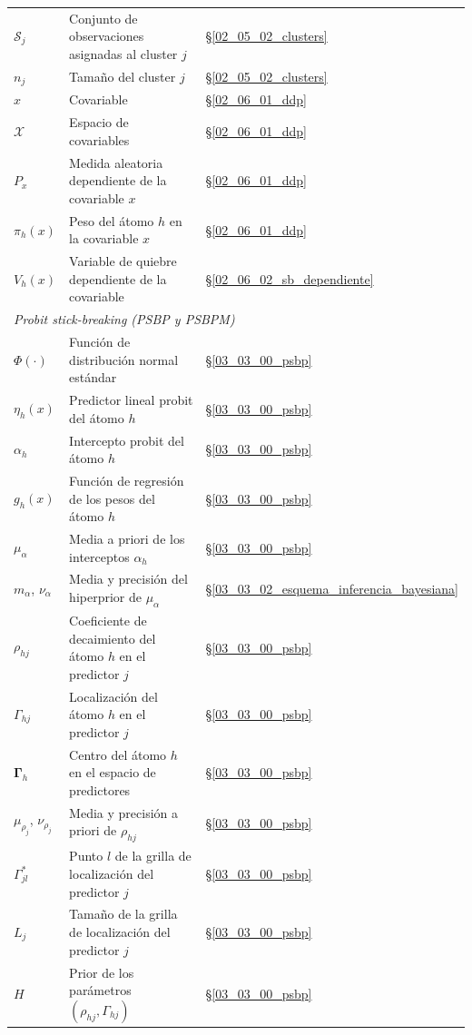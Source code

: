 \begin{longtable}{p{} p{} p{}}
$\mathcal{S}_j$ & Conjunto de observaciones asignadas al cluster $j$ & \S\ref{02_05_02_clusters} \\
$n_j$ & Tamaño del cluster $j$ & \S\ref{02_05_02_clusters} \\
$x$ & Covariable & \S\ref{02_06_01_ddp} \\
$\mathcal{X}$ & Espacio de covariables & \S\ref{02_06_01_ddp} \\
$P_x$ & Medida aleatoria dependiente de la covariable $x$ & \S\ref{02_06_01_ddp} \\
$\pi_h(x)$ & Peso del átomo $h$ en la covariable $x$ & \S\ref{02_06_01_ddp} \\
$V_h(x)$ & Variable de quiebre dependiente de la covariable & \S\ref{02_06_02_sb_dependiente} \\
\hline
\multicolumn{3}{l}{\textit{Probit stick-breaking (PSBP y PSBPM)}} \\
\hline
$\Phi(\cdot)$ & Función de distribución normal estándar & \S\ref{03_03_00_psbp} \\
$\eta_h(x)$ & Predictor lineal probit del átomo $h$ & \S\ref{03_03_00_psbp} \\
$\alpha_h$ & Intercepto probit del átomo $h$ & \S\ref{03_03_00_psbp} \\
$g_h(x)$ & Función de regresión de los pesos del átomo $h$ & \S\ref{03_03_00_psbp} \\
$\mu_\alpha$ & Media a priori de los interceptos $\alpha_h$ & \S\ref{03_03_00_psbp} \\
$m_\alpha$, $\nu_\alpha$ & Media y precisión del hiperprior de $\mu_\alpha$ & \S\ref{03_03_02_esquema_inferencia_bayesiana} \\
$\rho_{hj}$ & Coeficiente de decaimiento del átomo $h$ en el predictor $j$ & \S\ref{03_03_00_psbp} \\
$\Gamma_{hj}$ & Localización del átomo $h$ en el predictor $j$ & \S\ref{03_03_00_psbp} \\
$\boldsymbol{\Gamma}_h$ & Centro del átomo $h$ en el espacio de predictores & \S\ref{03_03_00_psbp} \\
$\mu_{\rho_j}$, $\nu_{\rho_j}$ & Media y precisión a priori de $\rho_{hj}$ & \S\ref{03_03_00_psbp} \\
$\Gamma_{jl}^*$ & Punto $l$ de la grilla de localización del predictor $j$ & \S\ref{03_03_00_psbp} \\
$L_j$ & Tamaño de la grilla de localización del predictor $j$ & \S\ref{03_03_00_psbp} \\
$H$ & Prior de los parámetros $(\rho_{hj}, \Gamma_{hj})$ & \S\ref{03_03_00_psbp} \\

\end{longtable}
